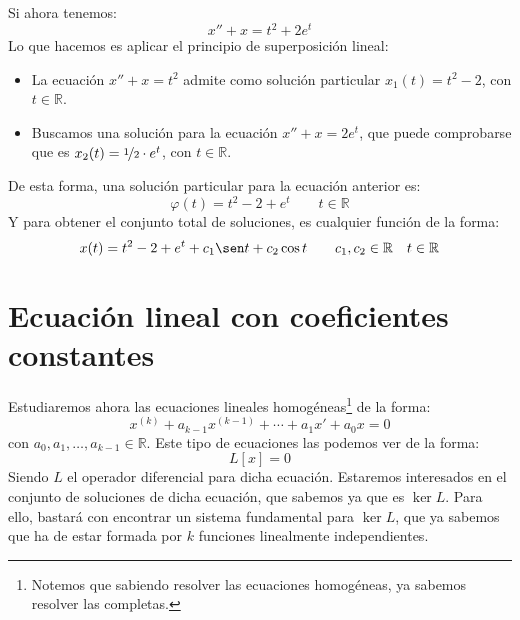 \begin{ejemplo}
    Si ahora tenemos:
    \begin{equation*}
        x'' + x = t^2 + 2e^t
    \end{equation*}
    Lo que hacemos es aplicar el principio de superposición lineal:
    \begin{itemize}
        \item La ecuación $x'' + x = t^2$ admite como solución particular $x_1(t) = t^2 - 2$, con $t\in \mathbb{R}$.
        \item Buscamos una solución para la ecuación $x'' + x = 2e^t$, que puede comprobarse que es $x_2(t) = \nicefrac{1}{2}\cdot e^t$, con $t\in \mathbb{R}$.
    \end{itemize}
    De esta forma, una solución particular para la ecuación anterior es:
    \begin{equation*}
        \varphi(t) = t^2 - 2 + e^t \qquad t\in \mathbb{R}
    \end{equation*}
    Y para obtener el conjunto total de soluciones, es cualquier función de la forma:
    \begin{equation*}
        x(t) = t^2 - 2 + e^t + c_1 \sen t + c_2 \cos t \qquad c_1,c_2 \in \mathbb{R} \quad t\in \mathbb{R}
    \end{equation*}
\end{ejemplo}

\section{Ecuación lineal con coeficientes constantes}
\noindent
Estudiaremos ahora las ecuaciones lineales homogéneas\footnote{Notemos que sabiendo resolver las ecuaciones homogéneas, ya sabemos resolver las completas.} de la forma:
\begin{equation}\label{eq:lin_homog_cte}
    x^{(k)} + a_{k-1}x^{(k-1)} + \cdots + a_1x' + a_0 x = 0
\end{equation}
con $a_0,a_1,\ldots,a_{k-1}\in \mathbb{R}$. Este tipo de ecuaciones las podemos ver de la forma:
\begin{equation*}
    L[x] = 0
\end{equation*}
Siendo $L$ el operador diferencial para dicha ecuación. Estaremos interesados en el conjunto de soluciones de dicha ecuación, que sabemos ya que es $\ker L$. Para ello, bastará con encontrar un sistema fundamental para $\ker L$, que ya sabemos que ha de estar formada por $k$ funciones linealmente independientes.\\

